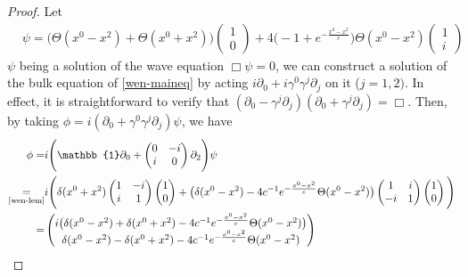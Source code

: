 \begin{proof}
Let 
\begin{equation*}
\begin{split}
& \psi = \big(\Theta(x^0 - x^2) + \Theta(x^0 + x^2) \big) 
\begin{pmatrix} 1 \\ 0 \end{pmatrix} 
+ 4\big(-1+ e^{-\frac{x^0 - x^2}{c}}\big)\Theta(x^0-x^2)\begin{pmatrix} 1 \\ i \end{pmatrix}
\end{split}
\end{equation*}
$\psi$ being a solution of the wave equation $\Box \psi = 0$,
we can construct a solution of the bulk equation of \cref{wen-maineq} by acting $i\partial_0 + i\gamma^0\gamma^j \partial_j$ on it ($j= 1, 2)$.
In effect, it is straightforward to verify that $(\partial_0 - \gamma^j\partial_j)(\partial_0 + \gamma^j\partial_j) = \Box$. 
Then, by taking $\phi = i(\partial_0 + \gamma^0\gamma^j\partial_j)\psi$, we have
\begin{equation*}
\begin{split}
\phi = &
i\Bigg(\mathbb{1}\partial_0 + \begin{pmatrix} 0 &-i \\ i &0\end{pmatrix}\partial_2  \Bigg)\psi \\
\underset{\textrm{\cref{wen-lem}}}{=}&
i\Bigg( \delta(x^0 + x^2)\begin{pmatrix} 1 & -i \\ i & 1 \end{pmatrix} \begin{pmatrix}1 \\ 0 \end{pmatrix}
+ \big( \delta(x^0 - x^2) - 4c^{-1} e^{-\frac{x^0-x^2}{c}}\Theta(x^0-x^2)\big)
\begin{pmatrix} 1 & i \\ -i & 1 \end{pmatrix} \begin{pmatrix}1 \\ 0 \end{pmatrix} \Bigg) \\
= &
\begin{pmatrix}
i \big(\delta(x^0 - x^2) + \delta(x^0 + x^2) - 4c^{-1}e^{- \frac{x^0-x^2}{c}}\Theta(x^0-x^2) \big) \\
\delta({x^0 - x^2}) - \delta(x^0 + x^2) - 4c^{-1}e^{- \frac{x^0-x^2}{c}}\Theta(x^0-x^2) \end{pmatrix}

\end{split}
\end{equation*}
\end{proof}
